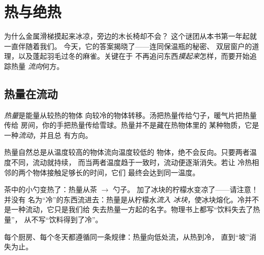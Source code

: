 \chapter{热与绝热}\label{ch:g5:heat-and-insulation}

为什么金属滑梯摸起来冰凉，旁边的木长椅却不会？
这个谜团从本书第一年起就一直伴随着我们。
今天，它的答案揭晓了——连同保温瓶的秘密、
双层窗户的道理，以及蓬起羽毛过冬的麻雀。关键在于
不再追问东西\emph{摸起来}怎样，而要开始追踪热量
\emph{流向}何方。

\section{热量在流动}

\begin{definition}[热量]\label{def:g5:heat-and-insulation:heat}
\emph{热量}是能量从较热的物体
向较冷的物体转移。汤把热量传给勺子，暖气片把热量传给
房间，你的手把热量传给雪球。热量并不是藏在热物体里的
某种物质，它是一种\emph{流动}，并且总
有方向。
\end{definition}

\begin{proposition}[热量向低处流]\label{prop:g5:heat-and-insulation:downhill}
热量自然总是从温度较高的物体流向温度较低的
物体，绝不会反向。只要两者温度不同，流动就持续，
而当两者温度趋于一致时，流动便逐渐消失。若让
冷热相邻的两个物体接触足够长的时间，它们
最终会达到同一温度。
\end{proposition}

\begin{example}[判断热量的方向]\label{ex:g5:heat-and-insulation:direction}
茶中的小勺变热了：热量从茶 $\to$ 勺子。
加了冰块的柠檬水变凉了——请注意！并没有
名为“冷”的东西流进去：热量是从柠檬水\emph{流入
冰块}，使冰块熔化。冷并不是一种流动，它只是我们给
失去热量一方起的名字。物理书上都写“饮料失去了热量”，
从不写“饮料得到了冷”。
\end{example}

\begin{omfigure}

{\small 每个厨房、每个冬天都遵循同一条规律：热量向低处流，从热到冷，
直到“坡”消失为止。}
\end{omfigure}


